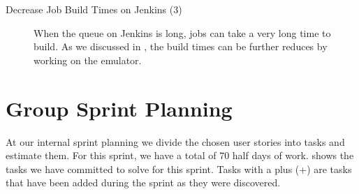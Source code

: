 \begin{description}
  \item[Decrease Job Build Times on Jenkins (3)] When the queue on Jenkins is long, jobs can take a very long time to build. As we discussed in , the build times can be further reduces by working on the emulator.
\end{description}

\section{Group Sprint Planning}\label{sec:S4_group}
At our internal sprint planning we divide the chosen user stories into tasks and estimate them. For this sprint, we have a total of 70 half days of work.  shows the tasks we have committed to solve for this sprint. Tasks with a plus (+) are tasks that have been added during the sprint as they were discovered.

